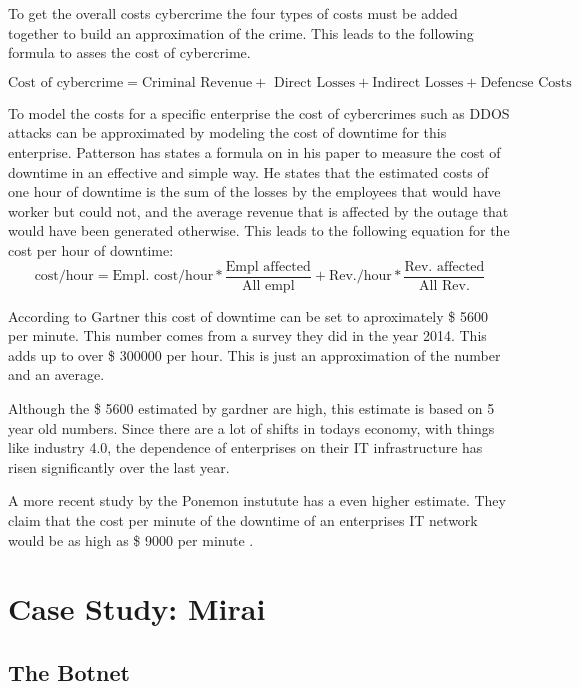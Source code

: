 To get the overall costs cybercrime the four types of costs must be added together to build an approximation of the crime. This leads to the following formula to asses the cost of cybercrime.

\begin{equation}
\text{Cost of cybercrime} = \text{Criminal Revenue} +\text{ Direct Losses} + \text{Indirect Losses} + \text{Defencse Costs}
\end{equation}

To model the costs for a specific enterprise the cost of cybercrimes such as DDOS attacks can be approximated by modeling the cost of downtime for this enterprise. 
Patterson has states a formula on in his paper to measure the cost of downtime in an effective and simple way. \cite{Patterson02} He states that the estimated costs of one hour of downtime is the sum of the losses by the employees that would have worker but could not, and the average revenue that is affected by the outage that would have been generated otherwise.
This leads to the following equation for the cost per hour of downtime: 
\begin{equation}
\text{cost/hour} = \text{Empl. cost/hour} * \frac{\text{Empl affected}}{\text{All empl}} + \text{Rev./hour} * \frac{\text{Rev. affected}}{\text{All Rev.}}
\end{equation}


According to Gartner \cite{Lerner14} this cost of downtime can be set to aproximately \$ 5600 per minute. This number comes from a survey they did in the year 2014. This adds up to over \$ 300000 per hour. This is just an approximation of the number and an average. 

Although the \$ 5600 estimated by gardner are high, this estimate is based on 5 year old numbers. Since there are a lot of shifts in todays economy, with things like industry 4.0, the dependence of enterprises on their IT infrastructure has risen significantly over the last year. 

A more recent study by the Ponemon instutute has a even higher estimate. They claim that the cost per minute of the downtime of an enterprises IT network would be as high as \$ 9000 per minute \cite{Ponemon16}.

\section{Case Study: Mirai}
	\subsection{The Botnet}
